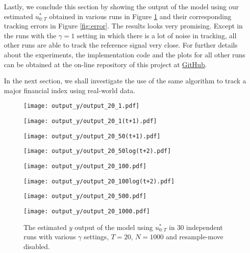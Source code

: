 Lastly, we conclude this section by showing the output of the model using our estimated $u^*_{0:T}$ obtained in various runs in Figure \ref{fig:estimatedy} and their corresponding tracking errors in Figure \ref{fig:error}. The results looks very promising. Except in the runs with the $\gamma=1$ setting in which there is a lot of noise in tracking, all other runs are able to track the reference signal very close. For further details about the experiments, the implementation code and the plots for all other runs can be obtained at the on-line repository of this project at \href{https://github.com/yowtzu/mscproj}{GitHub}.

In the next section, we shall investigate the use of the same algorithm to track a major financial index using real-world data. 

\begin{figure}[!thbp]
    \centering
    \begin{minipage}{.5\textwidth}
        \centering
        \texttt{[image: output\_y/output\_20\_1.pdf]}
    \end{minipage}%
    \begin{minipage}{0.5\textwidth}
        \centering
        \texttt{[image: output\_y/output\_20\_1(t+1).pdf]}
    \end{minipage}
    \begin{minipage}{0.5\textwidth}
        \centering
        \texttt{[image: output\_y/output\_20\_50(t+1).pdf]}
    \end{minipage}%
    \begin{minipage}{0.5\textwidth}
        \centering
        \texttt{[image: output\_y/output\_20\_50log(t+2).pdf]}
    \end{minipage}
    \begin{minipage}{0.5\textwidth}
        \centering
        \texttt{[image: output\_y/output\_20\_100.pdf]}
    \end{minipage}%
    \begin{minipage}{0.5\textwidth}
        \centering
        \texttt{[image: output\_y/output\_20\_100log(t+2).pdf]}
    \end{minipage}
    \begin{minipage}{0.5\textwidth}
        \centering
        \texttt{[image: output\_y/output\_20\_500.pdf]}
    \end{minipage}%
    \begin{minipage}{0.5\textwidth}
        \centering
        \texttt{[image: output\_y/output\_20\_1000.pdf]}
    \end{minipage}
    \caption{The estimated $y$ output of the model using $u^*_{0:T}$ in 30 independent runs with various $\gamma$ settings, $T=20$, $N=1000$ and resample-move disabled.}
    \label{fig:estimatedy}
\end{figure}

